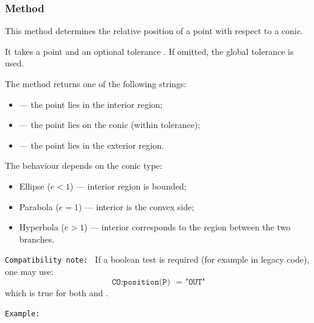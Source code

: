 \subsubsection{Method }
\label{ssub:method_conic_position}

This method determines the relative position of a point with respect to a conic.

\medskip

It takes a point  and an optional tolerance .
If omitted, the global tolerance  is used.

\medskip

The method returns one of the following strings:
\begin{itemize}
  \item {}  — the point lies in the interior region;
  \item {}  — the point lies on the conic (within tolerance);
  \item {} — the point lies in the exterior region.
\end{itemize}

\medskip

The behaviour depends on the conic type:
\begin{itemize}
  \item Ellipse (\(e < 1\)) — interior region is bounded;
  \item Parabola (\(e = 1\)) — interior is the convex side;
  \item Hyperbola (\(e > 1\)) — interior corresponds to the region
        between the two branches.
\end{itemize}

\medskip

\noindent\texttt{Compatibility note: }
If a boolean test is required (for example in legacy code),
one may use:
\[
\texttt{CO:position(P) ~= "OUT"}
\]
which is true for both  and .

\vspace{1em}

\texttt{Example: }


